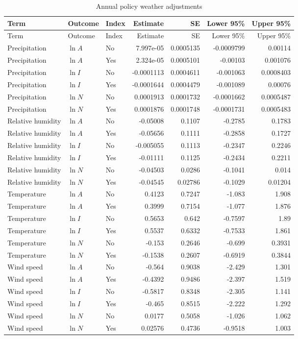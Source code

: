 {\small
\begin{longtable}{@{}ll l r r rr@{}}
\caption{Annual policy weather adjustments}\label{tab:si_policy_weather}\\
\toprule
Term & Outcome & Index & Estimate & SE & Lower 95\% & Upper 95\%\\\midrule
\endfirsthead
\toprule Term & Outcome & Index & Estimate & SE & Lower 95\% & Upper 95\%\\\midrule
\endhead
Precipitation & $\ln A$ & No & 7.997e-05 & 0.0005135 & -0.0009799 & 0.00114\\
Precipitation & $\ln A$ & Yes & 2.324e-05 & 0.0005101 & -0.00103 & 0.001076\\
Precipitation & $\ln I$ & No & -0.0001113 & 0.0004611 & -0.001063 & 0.0008403\\
Precipitation & $\ln I$ & Yes & -0.0001644 & 0.0004479 & -0.001089 & 0.00076\\
Precipitation & $\ln N$ & No & 0.0001913 & 0.0001732 & -0.0001662 & 0.0005487\\
Precipitation & $\ln N$ & Yes & 0.0001876 & 0.0001748 & -0.0001731 & 0.0005483\\
Relative humidity & $\ln A$ & No & -0.05008 & 0.1107 & -0.2785 & 0.1783\\
Relative humidity & $\ln A$ & Yes & -0.05656 & 0.1111 & -0.2858 & 0.1727\\
Relative humidity & $\ln I$ & No & -0.005055 & 0.1113 & -0.2347 & 0.2246\\
Relative humidity & $\ln I$ & Yes & -0.01111 & 0.1125 & -0.2434 & 0.2211\\
Relative humidity & $\ln N$ & No & -0.04503 & 0.0286 & -0.1041 & 0.014\\
Relative humidity & $\ln N$ & Yes & -0.04545 & 0.02786 & -0.1029 & 0.01204\\
Temperature & $\ln A$ & No & 0.4123 & 0.7247 & -1.083 & 1.908\\
Temperature & $\ln A$ & Yes & 0.3999 & 0.7154 & -1.077 & 1.876\\
Temperature & $\ln I$ & No & 0.5653 & 0.642 & -0.7597 & 1.89\\
Temperature & $\ln I$ & Yes & 0.5537 & 0.6332 & -0.7533 & 1.861\\
Temperature & $\ln N$ & No & -0.153 & 0.2646 & -0.699 & 0.3931\\
Temperature & $\ln N$ & Yes & -0.1538 & 0.2607 & -0.6919 & 0.3844\\
Wind speed & $\ln A$ & No & -0.564 & 0.9038 & -2.429 & 1.301\\
Wind speed & $\ln A$ & Yes & -0.4392 & 0.9486 & -2.397 & 1.519\\
Wind speed & $\ln I$ & No & -0.5817 & 0.8348 & -2.305 & 1.141\\
Wind speed & $\ln I$ & Yes & -0.465 & 0.8515 & -2.222 & 1.292\\
Wind speed & $\ln N$ & No & 0.0177 & 0.5058 & -1.026 & 1.062\\
Wind speed & $\ln N$ & Yes & 0.02576 & 0.4736 & -0.9518 & 1.003\\
\bottomrule
\end{longtable}
}
